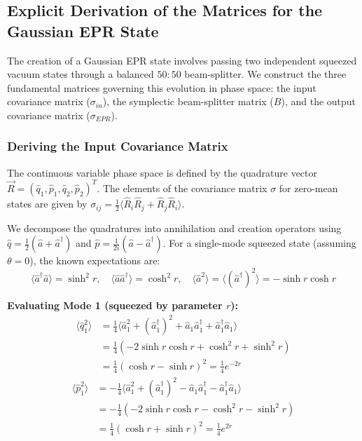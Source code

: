 {\subsection{Explicit Derivation of the Matrices for the Gaussian EPR State}

The creation of a Gaussian EPR state involves passing two independent squeezed vacuum states through a balanced $50{:}50$ beam-splitter. We construct the three fundamental matrices governing this evolution in phase space: the input covariance matrix ($\sigma_{in}$), the symplectic beam-splitter matrix ($B$), and the output covariance matrix ($\sigma_{EPR}$). 

\subsubsection{Deriving the Input Covariance Matrix }
The continuous variable phase space is defined by the quadrature vector $\vec{R} = (\hat{q}_1, \hat{p}_1, \hat{q}_2, \hat{p}_2)^T$. The elements of the covariance matrix $\sigma$ for zero-mean states are given by $\sigma_{ij} = \frac{1}{2}\langle \hat{R}_i\hat{R}_j + \hat{R}_j\hat{R}_i \rangle$. 

We decompose the quadratures into annihilation and creation operators using $\hat{q} = \frac{1}{2}(\hat{a} + \hat{a}^\dagger)$ and $\hat{p} = \frac{1}{2i}(\hat{a} - \hat{a}^\dagger)$.
For a single-mode squeezed state (assuming $\theta = 0$), the known expectations are:
\begin{equation*}
\langle \hat{a}^\dagger\hat{a} \rangle = \sinh^2 r, \quad \langle \hat{a}\hat{a}^\dagger \rangle = \cosh^2 r, \quad \langle \hat{a}^2 \rangle = \langle (\hat{a}^\dagger)^2 \rangle = -\sinh r \cosh r
\end{equation*}

\textbf{Evaluating Mode 1 (squeezed by parameter $r$):}
\begin{align*}
\langle\hat{q}_1^2\rangle &= \frac{1}{4} \langle \hat{a}_1^2 + (\hat{a}_1^\dagger)^2 + \hat{a}_1\hat{a}_1^\dagger + \hat{a}_1^\dagger\hat{a}_1 \rangle \\
&= \frac{1}{4} \left( -2\sinh r \cosh r + \cosh^2 r + \sinh^2 r \right) \\
&= \frac{1}{4} (\cosh r - \sinh r)^2 = \frac{1}{4}e^{-2r}
\end{align*}
\begin{align*}
\langle\hat{p}_1^2\rangle &= -\frac{1}{4} \langle \hat{a}_1^2 + (\hat{a}_1^\dagger)^2 - \hat{a}_1\hat{a}_1^\dagger - \hat{a}_1^\dagger\hat{a}_1 \rangle \\
&= -\frac{1}{4} \left( -2\sinh r \cosh r - \cosh^2 r - \sinh^2 r \right) \\
&= \frac{1}{4} (\cosh r + \sinh r)^2 = \frac{1}{4}e^{2r}
\end{align*}

}
